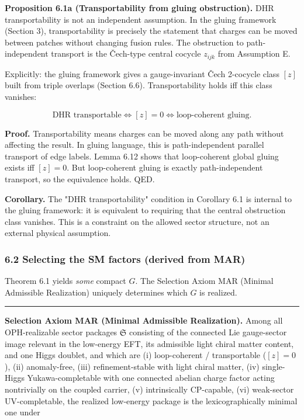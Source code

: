\textbf{Proposition 6.1a (Transportability from gluing obstruction).} DHR transportability is not an independent assumption. In the gluing framework (Section 3), transportability is precisely the statement that charges can be moved between patches without changing fusion rules. The obstruction to path-independent transport is the \v{C}ech-type central cocycle \(z_{ijk}\) from Assumption E.

Explicitly: the gluing framework gives a gauge-invariant \v{C}ech 2-cocycle class \([z]\) built from triple overlaps (Section 6.6). Transportability holds iff this class vanishes:

\[
\text{DHR transportable} \iff [z] = 0 \iff \text{loop-coherent gluing}.
\]

\textbf{Proof.} Transportability means charges can be moved along any path without affecting the result. In gluing language, this is path-independent parallel transport of edge labels. Lemma 6.12 shows that loop-coherent global gluing exists iff \([z] = 0\). But loop-coherent gluing is exactly path-independent transport, so the equivalence holds. QED.

\textbf{Corollary.} The "DHR transportability" condition in Corollary 6.1 is internal to the gluing framework: it is equivalent to requiring that the central obstruction class vanishes. This is a constraint on the allowed sector structure, not an external physical assumption.

\subsubsection{6.2 Selecting the SM factors (derived from MAR)}\label{62-selecting-the-sm-factors-derived-from-mar}

Theorem 6.1 yields \emph{some} compact \(G\). The Selection Axiom MAR (Minimal Admissible Realization) uniquely determines which \(G\) is realized.

\begin{center}\rule{0.5\linewidth}{0.5pt}\end{center}

\textbf{Selection Axiom MAR (Minimal Admissible Realization).} Among all OPH-realizable sector packages \(\mathfrak S\) consisting of the connected Lie gauge-sector image relevant in the low-energy EFT, its admissible light chiral matter content, and one Higgs doublet, and which are (i) loop-coherent / transportable (\([z]=0\)), (ii) anomaly-free, (iii) refinement-stable with light chiral matter, (iv) single-Higgs Yukawa-completable with one connected abelian charge factor acting nontrivially on the coupled carrier, (v) intrinsically CP-capable, (vi) weak-sector UV-completable, the realized low-energy package is the lexicographically minimal one under


